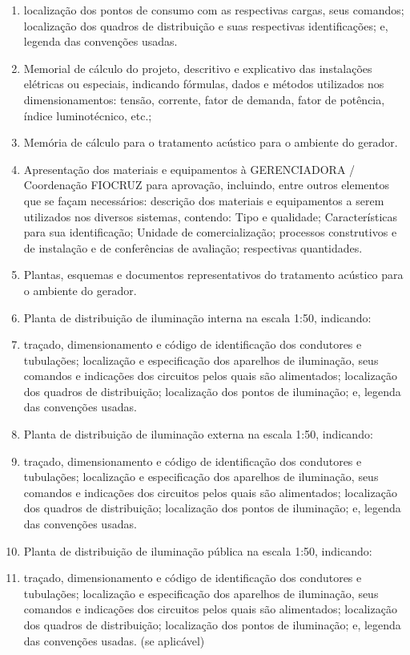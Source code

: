 \begin{enumerate}
\item localização dos pontos de consumo com as respectivas cargas, seus comandos; localização dos quadros de distribuição e suas respectivas identificações; e, legenda das convenções usadas.
		
		
		\item Memorial de cálculo do projeto, descritivo e explicativo das instalações elétricas ou especiais, indicando fórmulas, dados e métodos utilizados nos dimensionamentos: tensão, corrente, fator de demanda, fator de potência, índice luminotécnico, etc.;
		\item Memória de cálculo para o tratamento acústico para o ambiente do gerador.
		\item Apresentação dos materiais e equipamentos à GERENCIADORA / Coordenação FIOCRUZ para aprovação, incluindo, entre outros elementos que se façam necessários: descrição dos materiais e equipamentos a serem utilizados nos diversos sistemas, contendo: Tipo e qualidade; Características para sua identificação; Unidade de comercialização; processos construtivos e de instalação e de conferências de avaliação; respectivas quantidades.
		\item Plantas, esquemas e documentos representativos do tratamento acústico para o ambiente do gerador.
		\item Planta de distribuição de iluminação interna na escala 1:50,  indicando: 
		\item traçado, dimensionamento e código de identificação dos condutores e tubulações; localização e especificação dos aparelhos de iluminação, seus comandos e indicações dos circuitos pelos quais são alimentados; localização dos quadros de distribuição; localização dos pontos de iluminação; e, legenda das convenções usadas.
		\item Planta de distribuição de iluminação externa na escala 1:50,  indicando: 
		\item traçado, dimensionamento e código de identificação dos condutores e tubulações; localização e especificação dos aparelhos de iluminação, seus comandos e indicações dos circuitos pelos quais são alimentados; localização dos quadros de distribuição; localização dos pontos de iluminação; e, legenda das convenções usadas.
		\item Planta de distribuição de iluminação pública na escala 1:50,  indicando: 
		\item traçado, dimensionamento e código de identificação dos condutores e tubulações; localização e especificação dos aparelhos de iluminação, seus comandos e indicações dos circuitos pelos quais são alimentados; localização dos quadros de distribuição; localização dos pontos de iluminação; e, legenda das convenções usadas. (se aplicável)

\end{enumerate}
